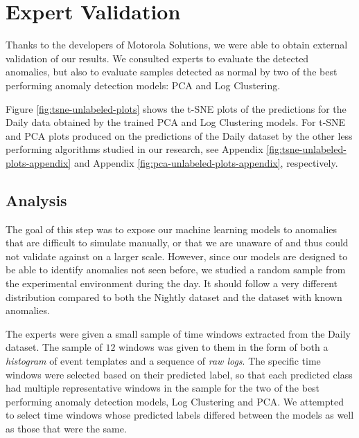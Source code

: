 \section{Expert Validation}

Thanks to the developers of Motorola Solutions, we were able to obtain external validation of our results. We consulted experts to evaluate the detected anomalies, but also to evaluate samples detected as normal by two of the best performing anomaly detection models: PCA and Log Clustering.

Figure \ref{fig:tsne-unlabeled-plots} shows the t-SNE plots of the predictions for the Daily data obtained by the trained PCA and Log Clustering models. For t-SNE and PCA plots produced on the predictions of the Daily dataset by the other less performing algorithms studied in our research, see Appendix \ref{fig:tsne-unlabeled-plots-appendix} and Appendix \ref{fig:pca-unlabeled-plots-appendix}, respectively. 
\begin{figure}%
\end{figure}

\subsection{Analysis}
The goal of this step was to expose our machine learning models to anomalies that are difficult to simulate manually, or that we are unaware of and thus could not validate against on a larger scale. However, since our models are designed to be able to identify anomalies not seen before, we studied a random sample from the experimental environment during the day. It should follow a very different distribution compared to both the Nightly dataset and the dataset with known anomalies.

The experts were given a small sample of time windows extracted from the Daily dataset. The sample of $12$ windows was given to them in the form of both a \textit{histogram} of event templates and a sequence of \textit{raw logs}. The specific time windows were selected based on their predicted label, so that each predicted class had multiple representative windows in the sample for the two of the best performing anomaly detection models, Log Clustering and PCA. We attempted to select time windows whose predicted labels differed between the models as well as those that were the same.

